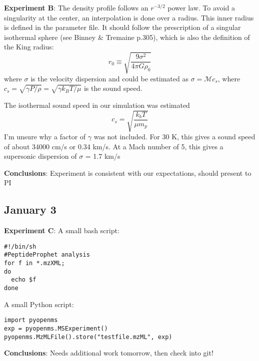 \documentclass[12pt]{report}
\begin{document}
\textbf{Experiment B}: 
The density profile follows an $r^{-3/2}$ power law. To avoid a singularity at the center, an interpolation is done over a radius. This inner radius is defined in the parameter file. It should follow the prescription of a singular isothermal sphere (see Binney \& Tremaine p.305), which is also the definition of the King radius:
\begin{equation}
r_0 \equiv \sqrt{\frac{9\sigma^2}{4\pi G\rho_0}}
\end{equation}
where $\sigma$ is the velocity dispersion and could be estimated as $\sigma = \mathcal{M} c_s$, where $c_s = \sqrt{\gamma P/\rho} = \sqrt{\gamma k_B T / \mu}$ is the sound speed.

The isothermal sound speed in our simulation was estimated
\begin{equation}
c_s = \sqrt{\frac{k_b T}{\mu m_p}}
\end{equation}
I'm unsure why a factor of $\gamma$ was not included. For 30 K, this gives a sound speed of about 34000 cm/s or 0.34 km/s. At a Mach number of 5, this gives a supersonic dispersion of $\sigma$ = 1.7 km/s

\textbf{Conclusions}: Experiment is consistent with our expectations, should present to PI

\subsection{January 3}
\textbf{Experiment C}: 
A small bash script:

\begin{verbatim}
#!/bin/sh
#PeptideProphet analysis
for f in *.mzXML;
do
  echo $f  
done
\end{verbatim}

A small Python script:

\begin{verbatim}
import pyopenms
exp = pyopenms.MSExperiment()
pyopenms.MzMLFile().store("testfile.mzML", exp)
\end{verbatim}

\textbf{Conclusions}: Needs additional work tomorrow, then check into git! 
\end{document}
